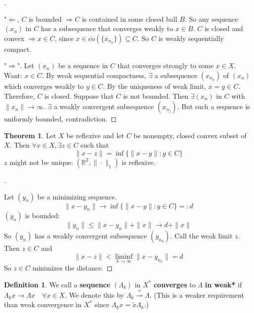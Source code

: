 \documentclass{article}
\theoremstyle{definition}
\newtheorem{thm}{Theorem}
\newtheorem{dfn}{Definition}
\newenvironment{proofs}[1][\proofname]{%
  \begin{proof}[#1]$ $\par\nobreak\ignorespaces
}{%
  \end{proof}
}
\newcommand{\RR}{\mathbb R}
\newcommand{\Ra}{\Rightarrow}
\newcommand{\La}{\Leftarrow}
\newcommand{\ru}{\rightharpoonup}
\begin{document}
\begin{proofs}
	"$\La$, $C$ is bounded $\Ra C$ is contained in some closed ball $B$.
	So any sequence $(x_n)$ in $C$ has a subsequence that converges weakly to $x \in B$.
	$C$ is closed and convex $\Ra x \in C$, since $x \in \overline{\text{co}}(\{x_{n_k}\}) \subseteq C$.
	So $C$ is weakly sequentially compact.
	\par "$\Ra$". Let $(x_n)$ be a sequence in $C$ that converges strongly to some $x \in X$.
	Want: $x \in C$.
	By weak sequential compactness, $\exists$ a subsequence $(x_{n_k})$ of $(x_n)$ which converges weakly to $y \in C$.
	By the uniqueness of weak limit, $x = y \in C$.
	Therefore, $C$ is closed.
	Suppose that $C$ is not bounded.
	Then $\exists (x_n)$ in $C$ with $\|x_n\| \to \infty$.
	$\exists$ a weakly convergent subsequence $(x_{n_j})$.
	But such a sequence is uniformly bounded, contradiction.
\end{proofs}

\begin{thm}
	Let $X$ be reflexive and let $C$ be nonempty, closed convex subset of $X$.
	Then $\forall x \in X, \exists z \in C$ such that
	\[
		\|x - z\| = \inf\{ \|x - y\|: y \in C\}
	\]
	$z$ might not be unique: $(\RR^2, \|\cdot\|_1)$ is reflexive.
\end{thm}

\begin{proofs}
	Let $(y_n)$ be a minimizing sequence.
	\[
		\|x - y_n\| \to \inf\{ \|x - y\|: y \in C\} =: d
	\]
	$(y_n)$ is bounded:
	\[
		\|y_n\| \leq \|x - y_n\| + \|x\| \to d + \|x\|
	\]
	So $(y_n)$ has a weakly convergent subsequence $(y_{n_k})$.
	Call the weak limit $z$.
	Then $z \in C$ and 
	\[
		\|x - z\| < \liminf_{k \to \infty} \|x - y_{n_k}\| = d
	\]
	So $z \in C$ minimizes the distance.
\end{proofs}

\begin{dfn}
	We call a \textbf{sequence} $(\Lambda_k)$ in $X^*$ \textbf{converges} to $\Lambda$ \textbf{in weak*} if $\Lambda_k x \to \Lambda x \quad \forall x \in X$.
	We denote this by $\Lambda_k \stackrel{*}{\ru} \Lambda$.
	(This is a weaker requirement than weak convergence in $X^*$ since $\Lambda_k x = \tilde{x} \Lambda_k$.)
\end{dfn}
\end{document}
